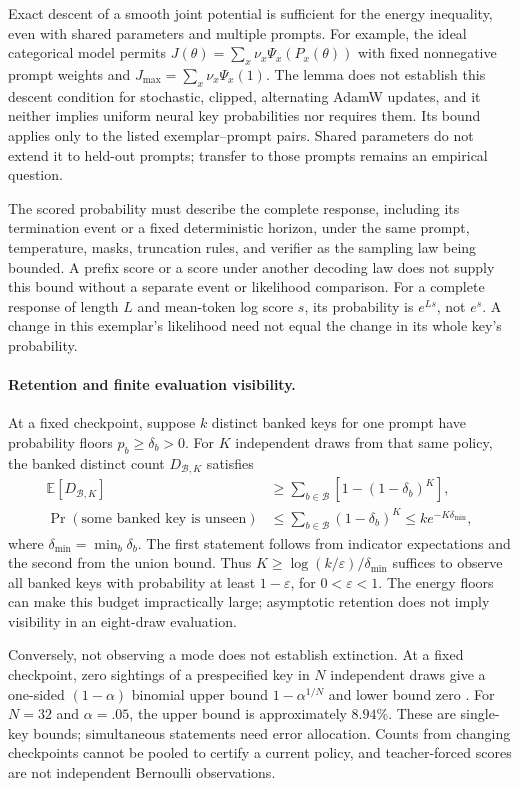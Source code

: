 \documentclass{article}
\newcommand{\1}{\mathbf 1}
\theoremstyle{remark}
\theoremstyle{definition}
\theoremstyle{plain}
\begin{document}
Exact descent of a smooth joint potential is sufficient for the energy
inequality, even with shared parameters and multiple prompts. For example,
the ideal categorical model permits
$J(\theta)=\sum_x\nu_x\Psi_x(P_x(\theta))$ with fixed nonnegative prompt
weights and $J_{\max}=\sum_x\nu_x\Psi_x(1)$. The lemma does not establish
this descent condition for stochastic, clipped, alternating AdamW updates,
and it neither implies uniform neural key probabilities nor requires them.
Its bound applies only to the listed exemplar--prompt pairs. Shared
parameters do not extend it to held-out prompts; transfer to those prompts
remains an empirical question.

The scored probability must describe the complete response, including its
termination event or a fixed deterministic horizon, under the same prompt,
temperature, masks, truncation rules, and verifier as the sampling law being
bounded. A prefix score or a score under another decoding law does not
supply this bound without a separate event or likelihood comparison.
For a complete response of length $L$ and mean-token log score $s$, its
probability is $e^{Ls}$, not $e^s$. A change in this exemplar's likelihood
need not equal the change in its whole key's probability.

\paragraph{Retention and finite evaluation visibility.}
At a fixed checkpoint, suppose $k$ distinct banked keys for one prompt have
probability floors $p_b\ge\delta_b>0$. For $K$ independent draws from that
same policy, the banked distinct count $D_{\mathcal B,K}$ satisfies
\[
 \begin{aligned}
 \mathbb E[D_{\mathcal B,K}]
 &\ge\sum_{b\in\mathcal B}\left[1-(1-\delta_b)^K\right],\\
 \Pr(\text{some banked key is unseen})
 &\le\sum_{b\in\mathcal B}(1-\delta_b)^K
 \le k e^{-K\delta_{\min}},
 \end{aligned}
\]
where $\delta_{\min}=\min_b\delta_b$. The first statement follows from
indicator expectations and the second from the union bound. Thus
$K\ge\log(k/\varepsilon)/\delta_{\min}$ suffices to observe all banked keys
with probability at least $1-\varepsilon$, for $0<\varepsilon<1$.
The energy floors can make this budget impractically large; asymptotic
retention does not imply visibility in an eight-draw evaluation.

Conversely, not observing a mode does not establish extinction. At a fixed
checkpoint, zero sightings of a prespecified key in $N$ independent draws
give a one-sided $(1-\alpha)$ binomial upper bound
$1-\alpha^{1/N}$ and lower bound zero \citep{clopper1934binomial}. For
$N=32$ and $\alpha=.05$, the upper bound is approximately $8.94\%$.
These are single-key bounds; simultaneous statements need error allocation.
Counts from changing checkpoints cannot be pooled to certify a current
policy, and teacher-forced scores are not independent Bernoulli observations.
\end{document}
